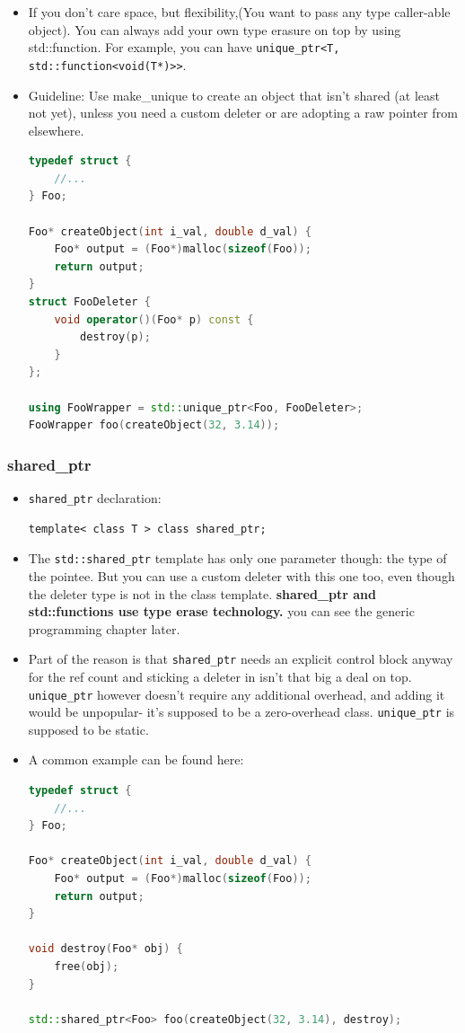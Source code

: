 \documentclass[a4paper,11pt,twoside]{book}
\begin{document}
\begin{itemize}
	
	\item If you don't care space, but flexibility,(You want to pass any type caller-able object).  You can always add your own type erasure on top by using std::function. For example, you can have \texttt{unique\_ptr<T, std::function<void(T*)>>}.
	
	\item Guideline: Use make\_unique to create an object that isn’t shared (at
	least not yet), unless you need a custom deleter or are adopting a raw
	pointer from elsewhere.
	
\begin{lstlisting}[frame=single, language=c++]
typedef struct {
	//...
} Foo;

Foo* createObject(int i_val, double d_val) {
	Foo* output = (Foo*)malloc(sizeof(Foo));
	return output;
}
struct FooDeleter {
	void operator()(Foo* p) const {
		destroy(p);
	}
};
	
using FooWrapper = std::unique_ptr<Foo, FooDeleter>;
FooWrapper foo(createObject(32, 3.14));
\end{lstlisting}


\end{itemize}

\subsubsection{shared\_ptr}
\begin{itemize}
	\item \texttt{shared\_ptr} declaration:
\begin{lstlisting}
template< class T > class shared_ptr;
\end{lstlisting}
	\item The \texttt{std::shared\_ptr} template has only one parameter though: the type of the pointee. But you can use a custom deleter with this one too, even though the deleter type is not in the class template. \textbf{shared\_ptr and std::functions use type erase technology.} you can see the generic programming chapter later.
	
	\item Part of the reason is that \texttt{shared\_ptr} needs an explicit control block anyway for the ref count and sticking a deleter in isn't that big a deal on top. \texttt{unique\_ptr} however doesn't require any additional overhead, and adding it would be unpopular- it's supposed to be a zero-overhead class. \texttt{unique\_ptr} is supposed to be static.
	
	\item A common example can be found here:
\begin{lstlisting}[frame=single, language=c++]
typedef struct {
	//...
} Foo;

Foo* createObject(int i_val, double d_val) {
	Foo* output = (Foo*)malloc(sizeof(Foo));
	return output;
}

void destroy(Foo* obj) {
	free(obj);
}

std::shared_ptr<Foo> foo(createObject(32, 3.14), destroy);
\end{lstlisting}
\end{itemize}
\end{document}
